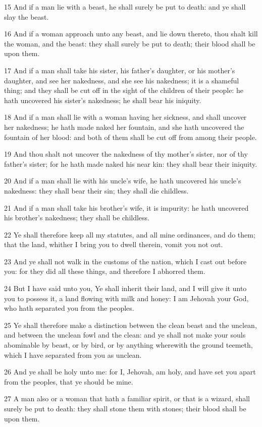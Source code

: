 \par 15 And if a man lie with a beast, he shall surely be put to death: and ye shall slay the beast.
\par 16 And if a woman approach unto any beast, and lie down thereto, thou shalt kill the woman, and the beast: they shall surely be put to death; their blood shall be upon them.
\par 17 And if a man shall take his sister, his father's daughter, or his mother's daughter, and see her nakedness, and she see his nakedness; it is a shameful thing; and they shall be cut off in the sight of the children of their people: he hath uncovered his sister's nakedness; he shall bear his iniquity.
\par 18 And if a man shall lie with a woman having her sickness, and shall uncover her nakedness; he hath made naked her fountain, and she hath uncovered the fountain of her blood: and both of them shall be cut off from among their people.
\par 19 And thou shalt not uncover the nakedness of thy mother's sister, nor of thy father's sister; for he hath made naked his near kin: they shall bear their iniquity.
\par 20 And if a man shall lie with his uncle's wife, he hath uncovered his uncle's nakedness: they shall bear their sin; they shall die childless.
\par 21 And if a man shall take his brother's wife, it is impurity: he hath uncovered his brother's nakedness; they shall be childless.
\par 22 Ye shall therefore keep all my statutes, and all mine ordinances, and do them; that the land, whither I bring you to dwell therein, vomit you not out.
\par 23 And ye shall not walk in the customs of the nation, which I cast out before you: for they did all these things, and therefore I abhorred them.
\par 24 But I have said unto you, Ye shall inherit their land, and I will give it unto you to possess it, a land flowing with milk and honey: I am Jehovah your God, who hath separated you from the peoples.
\par 25 Ye shall therefore make a distinction between the clean beast and the unclean, and between the unclean fowl and the clean: and ye shall not make your souls abominable by beast, or by bird, or by anything wherewith the ground teemeth, which I have separated from you as unclean.
\par 26 And ye shall be holy unto me: for I, Jehovah, am holy, and have set you apart from the peoples, that ye should be mine.
\par 27 A man also or a woman that hath a familiar spirit, or that is a wizard, shall surely be put to death: they shall stone them with stones; their blood shall be upon them.

